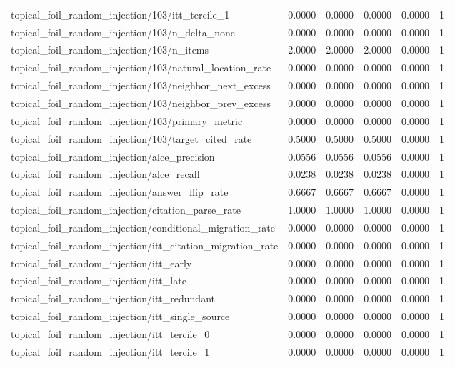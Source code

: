 \begin{table}[h]
\begin{tabular}{lrrrrr}
topical_foil_random_injection/103/itt_tercile_1 & 0.0000 & 0.0000 & 0.0000 & 0.0000 & 1 \\
topical_foil_random_injection/103/n_delta_none & 0.0000 & 0.0000 & 0.0000 & 0.0000 & 1 \\
topical_foil_random_injection/103/n_items & 2.0000 & 2.0000 & 2.0000 & 0.0000 & 1 \\
topical_foil_random_injection/103/natural_location_rate & 0.0000 & 0.0000 & 0.0000 & 0.0000 & 1 \\
topical_foil_random_injection/103/neighbor_next_excess & 0.0000 & 0.0000 & 0.0000 & 0.0000 & 1 \\
topical_foil_random_injection/103/neighbor_prev_excess & 0.0000 & 0.0000 & 0.0000 & 0.0000 & 1 \\
topical_foil_random_injection/103/primary_metric & 0.0000 & 0.0000 & 0.0000 & 0.0000 & 1 \\
topical_foil_random_injection/103/target_cited_rate & 0.5000 & 0.5000 & 0.5000 & 0.0000 & 1 \\
topical_foil_random_injection/alce_precision & 0.0556 & 0.0556 & 0.0556 & 0.0000 & 1 \\
topical_foil_random_injection/alce_recall & 0.0238 & 0.0238 & 0.0238 & 0.0000 & 1 \\
topical_foil_random_injection/answer_flip_rate & 0.6667 & 0.6667 & 0.6667 & 0.0000 & 1 \\
topical_foil_random_injection/citation_parse_rate & 1.0000 & 1.0000 & 1.0000 & 0.0000 & 1 \\
topical_foil_random_injection/conditional_migration_rate & 0.0000 & 0.0000 & 0.0000 & 0.0000 & 1 \\
topical_foil_random_injection/itt_citation_migration_rate & 0.0000 & 0.0000 & 0.0000 & 0.0000 & 1 \\
topical_foil_random_injection/itt_early & 0.0000 & 0.0000 & 0.0000 & 0.0000 & 1 \\
topical_foil_random_injection/itt_late & 0.0000 & 0.0000 & 0.0000 & 0.0000 & 1 \\
topical_foil_random_injection/itt_redundant & 0.0000 & 0.0000 & 0.0000 & 0.0000 & 1 \\
topical_foil_random_injection/itt_single_source & 0.0000 & 0.0000 & 0.0000 & 0.0000 & 1 \\
topical_foil_random_injection/itt_tercile_0 & 0.0000 & 0.0000 & 0.0000 & 0.0000 & 1 \\
topical_foil_random_injection/itt_tercile_1 & 0.0000 & 0.0000 & 0.0000 & 0.0000 & 1 \\

\end{tabular}
\end{table}
